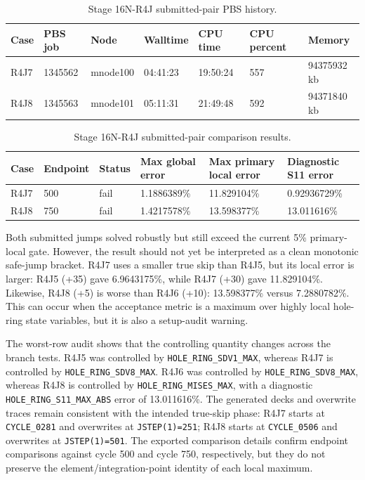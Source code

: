 \documentclass[11pt,a4paper]{article}
\newcommand{\code}[1]{\texttt{#1}}
\begin{document}
\begin{table}[H]
\centering
\caption{Stage 16N-R4J submitted-pair PBS history.}
\begin{tabular}{lllllll}
\toprule
Case & PBS job & Node & Walltime & CPU time & CPU percent & Memory \\
\midrule
R4J7 & 1345562 & mnode100 & 04:41:23 & 19:50:24 & 557 & 94375932 kb \\
R4J8 & 1345563 & mnode101 & 05:11:31 & 21:49:48 & 592 & 94371840 kb \\
\bottomrule
\end{tabular}
\end{table}

\begin{table}[H]
\centering
\caption{Stage 16N-R4J submitted-pair comparison results.}
\begin{tabular}{llllll}
\toprule
Case & Endpoint & Status & Max global error & Max primary local error & Diagnostic S11 error \\
\midrule
R4J7 & 500 & fail & 1.1886389\% & 11.829104\% & 0.92936729\% \\
R4J8 & 750 & fail & 1.4217578\% & 13.598377\% & 13.011616\% \\
\bottomrule
\end{tabular}
\end{table}

Both submitted jumps solved robustly but still exceed the current 5\% primary-local gate. However, the result should not yet be interpreted as a clean monotonic safe-jump bracket. R4J7 uses a smaller true skip than R4J5, but its local error is larger: R4J5 (+35) gave 6.9643175\%, while R4J7 (+30) gave 11.829104\%. Likewise, R4J8 (+5) is worse than R4J6 (+10): 13.598377\% versus 7.2880782\%. This can occur when the acceptance metric is a maximum over highly local hole-ring state variables, but it is also a setup-audit warning.

The worst-row audit shows that the controlling quantity changes across the branch tests. R4J5 was controlled by \code{HOLE\_RING\_SDV1\_MAX}, whereas R4J7 is controlled by \code{HOLE\_RING\_SDV8\_MAX}. R4J6 was controlled by \code{HOLE\_RING\_SDV8\_MAX}, whereas R4J8 is controlled by \code{HOLE\_RING\_MISES\_MAX}, with a diagnostic \code{HOLE\_RING\_S11\_MAX\_ABS} error of 13.011616\%. The generated decks and overwrite traces remain consistent with the intended true-skip phase: R4J7 starts at \code{CYCLE\_0281} and overwrites at \code{JSTEP(1)=251}; R4J8 starts at \code{CYCLE\_0506} and overwrites at \code{JSTEP(1)=501}. The exported comparison details confirm endpoint comparisons against cycle 500 and cycle 750, respectively, but they do not preserve the element/integration-point identity of each local maximum.
\end{document}
